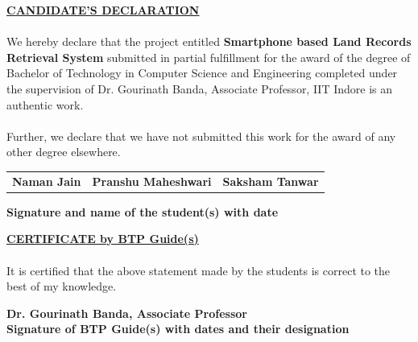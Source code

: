 \documentclass[12pt]{article}
\begin{document}

{
    \begin{center}
        \textbf{\underline{\large{CANDIDATE’S DECLARATION}}}
    \end{center}

    \paragraph{}
    We hereby declare that the project entitled \textbf{Smartphone based Land Records Retrieval System} submitted in partial fulfillment for the award of the degree of Bachelor of Technology in Computer Science and Engineering completed under the supervision of Dr. Gourinath Banda, Associate Professor, IIT Indore is an authentic work.

    \paragraph{}
    Further, we declare that we have not submitted this work for the award of any other degree elsewhere.

    \vspace{4cm}

    \begin{tabular}{c c c}
        \textbf{Naman Jain \space\space\space\space\space\space\space\space\space\space\space\space\space} & \textbf{Pranshu Maheshwari\space\space\space\space\space\space\space\space\space\space\space\space\space} & \textbf{Saksham Tanwar}\\
    \end{tabular}

    \begin{flushright}
        \textbf{Signature and name of the student(s) with date}
    \end{flushright}
    \vspace{1cm}

    \begin{center}
        \textbf{\underline{\large{CERTIFICATE by BTP Guide(s)}}}
    \end{center}

    \paragraph{}
    It is certified that the above statement made by the students is correct to the best of my knowledge.

    \vspace{3cm}

    \begin{flushright}
        \textbf{Dr. Gourinath Banda, Associate Professor}\\
        \textbf{Signature of BTP Guide(s) with dates and their designation}
    \end{flushright}

    \thispagestyle{empty}
}
\clearpage
\end{document}
